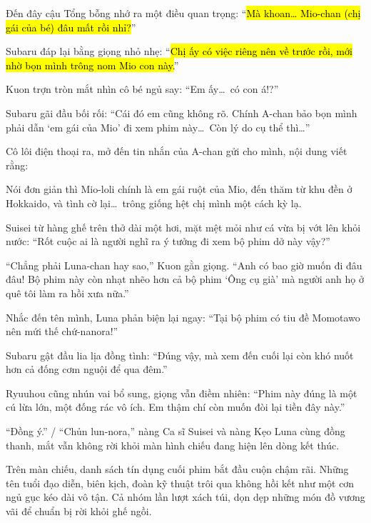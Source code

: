 \documentclass[../main.tex]{subfiles}
\begin{document}
Đến đây cậu Tổng bỗng nhớ ra một điều quan trọng: ``\hl{Mà khoan\dots{} Mio-chan (chị gái của bé) đâu mất rồi nhỉ?}''

Subaru đáp lại bằng giọng nhỏ nhẹ: ``\hl{Chị ấy có việc riêng nên về trước rồi, mới nhờ bọn mình trông nom Mio con này.}''

Kuon trợn tròn mắt nhìn cô bé ngủ say: ``Em ấy\dots\ có con á!?''

Subaru gãi đầu bối rối: ``Cái đó em cũng không rõ. Chính A-chan bảo bọn mình phải dẫn `em gái của Mio' đi xem phim này\dots\ Còn lý do cụ thể thì\dots''

Cô lôi điện thoại ra, mở đến tin nhắn của A-chan gửi cho mình, nội dung viết rằng:


Nói đơn giản thì Mio-loli chính là em gái ruột của Mio, đến thăm từ khu đền ở Hokkaido, và tình cờ lại\dots\ trông giống hệt chị mình một cách kỳ lạ.

Suisei từ hàng ghế trên thở dài một hơi, mặt mệt mỏi như cá vừa bị vớt lên khỏi nước: ``Rốt cuộc ai là người nghĩ ra ý tưởng đi xem bộ phim dở này vậy?''

``Chẳng phải Luna-chan hay sao,'' Kuon gằn giọng. ``Anh có bao giờ muốn đi đâu đâu! Bộ phim này còn nhạt nhẽo hơn cả bộ phim `Ông cụ già' mà người anh họ ở quê tôi làm ra hồi xưa nữa.''

Nhắc đến tên mình, Luna phản biện lại ngay: ``Tại bộ phim có tiu đề Momotawo nên mứi thế chứ-nanora!''

Subaru gật đầu lia lịa đồng tình: ``Đúng vậy, mà xem đến cuối lại còn khó nuốt hơn cả đống cơm nguội để qua đêm.''

Ryuuhou cũng nhún vai bổ sung, giọng vẫn điềm nhiên: ``Phim này đúng là một cú lừa lớn, một đống rác vô ích. Em thậm chí còn muốn đòi lại tiền đây này.''

``Đồng ý.'' / ``Chủn lun-nora,'' nàng Ca sĩ Suisei và nàng Kẹo Luna cùng đồng thanh, mắt vẫn không rời khỏi màn hình chiếu đang hiện lên dòng kết thúc.

Trên màn chiếu, danh sách tín dụng cuối phim bắt đầu cuộn chậm rãi. Những tên tuổi đạo diễn, biên kịch, đoàn kỹ thuật trôi qua không hồi kết như một cơn ngủ gục kéo dài vô tận. Cả nhóm lần lượt xách túi, dọn dẹp những món đồ vương vãi để chuẩn bị rời khỏi ghế ngồi.
\end{document}
